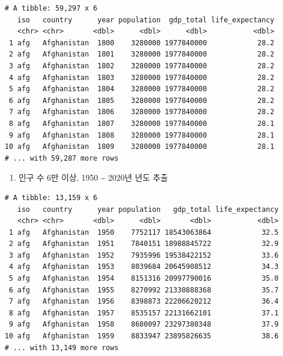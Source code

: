 \documentclass[
  11pt,
]{krantz}
\newenvironment{Shaded}{\begin{snugshade}}{\end{snugshade}}
\newcommand{\DecValTok}[1]{\textcolor[rgb]{0.06,0.06,0.06}{#1}}
\newcommand{\KeywordTok}[1]{\textcolor[rgb]{0.27,0.27,0.27}{\textbf{#1}}}
\newcommand{\NormalTok}[1]{#1}
\newcommand{\OperatorTok}[1]{\textcolor[rgb]{0.43,0.43,0.43}{\textbf{#1}}}
\newcommand{\StringTok}[1]{\textcolor[rgb]{0.5,0.5,0.5}{#1}}
\providecommand{\tightlist}{%
  \setlength{\itemsep}{0pt}\setlength{\parskip}{0pt}}
\begin{document}
\begin{verbatim}
# A tibble: 59,297 x 6
   iso   country      year population  gdp_total life_expectancy
   <chr> <chr>       <dbl>      <dbl>      <dbl>           <dbl>
 1 afg   Afghanistan  1800    3280000 1977840000            28.2
 2 afg   Afghanistan  1801    3280000 1977840000            28.2
 3 afg   Afghanistan  1802    3280000 1977840000            28.2
 4 afg   Afghanistan  1803    3280000 1977840000            28.2
 5 afg   Afghanistan  1804    3280000 1977840000            28.2
 6 afg   Afghanistan  1805    3280000 1977840000            28.2
 7 afg   Afghanistan  1806    3280000 1977840000            28.2
 8 afg   Afghanistan  1807    3280000 1977840000            28.1
 9 afg   Afghanistan  1808    3280000 1977840000            28.1
10 afg   Afghanistan  1809    3280000 1977840000            28.1
# ... with 59,287 more rows
\end{verbatim}

\normalsize

\begin{enumerate}
\def\labelenumi{\arabic{enumi}.}
\setcounter{enumi}{2}
\tightlist
\item
  인구 수 6만 이상, 1950 \textasciitilde{} 2020년 년도 추출
\end{enumerate}

\footnotesize

\begin{Shaded}
\end{Shaded}

\begin{verbatim}
# A tibble: 13,159 x 6
   iso   country      year population   gdp_total life_expectancy
   <chr> <chr>       <dbl>      <dbl>       <dbl>           <dbl>
 1 afg   Afghanistan  1950    7752117 18543063864            32.5
 2 afg   Afghanistan  1951    7840151 18988845722            32.9
 3 afg   Afghanistan  1952    7935996 19538422152            33.6
 4 afg   Afghanistan  1953    8039684 20645908512            34.3
 5 afg   Afghanistan  1954    8151316 20997790016            35.0
 6 afg   Afghanistan  1955    8270992 21330888368            35.7
 7 afg   Afghanistan  1956    8398873 22206620212            36.4
 8 afg   Afghanistan  1957    8535157 22131662101            37.1
 9 afg   Afghanistan  1958    8680097 23297380348            37.9
10 afg   Afghanistan  1959    8833947 23895826635            38.6
# ... with 13,149 more rows
\end{verbatim}
\end{document}
